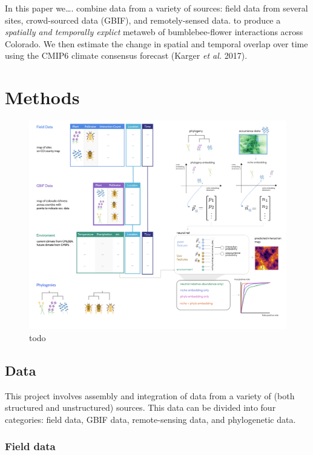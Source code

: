\documentclass[10pt,oneside]{article}
\makeatletter
\def\maxwidth{\ifdim\Gin@nat@width>\linewidth\linewidth
\else\Gin@nat@width\fi}
\let\Oldincludegraphics\includegraphics
\renewcommand{\includegraphics}[1]{\Oldincludegraphics[width=\maxwidth]{#1}}
\makeatother
\begin{document}
In this paper we\ldots. combine data from a variety of sources: field
data from several sites, crowd-sourced data (GBIF), and remotely-sensed
data. to produce a \emph{spatially and temporally explict} metaweb of
bumblebee-flower interactions across Colorado. We then estimate the
change in spatial and temporal overlap over time using the CMIP6 climate
consensus forecast (Karger \emph{et al.} 2017).

\hypertarget{methods}{%
\section{Methods}\label{methods}}

\begin{figure}
\hypertarget{fig:concept}{%
\centering
\includegraphics{./figures/concept_v2.png}
\caption{todo}\label{fig:concept}
}
\end{figure}

\hypertarget{data}{%
\subsection{Data}\label{data}}

This project involves assembly and integration of data from a variety of
(both structured and unstructured) sources. This data can be divided
into four categories: field data, GBIF data, remote-sensing data, and
phylogenetic data.

\hypertarget{field-data}{%
\subsubsection{Field data}\label{field-data}}
\end{document}
